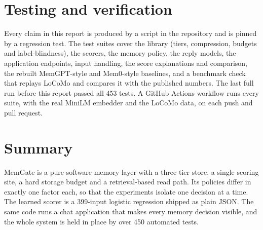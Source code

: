 \section{Testing and verification}
\label{sec:testing}
Every claim in this report is produced by a script in the repository and is
pinned by a regression test. The test suites cover the library (tiers,
compression, budgets and label-blindness), the scorers, the memory policy, the
reply models, the application endpoints, input handling, the score
explanations and comparison, the rebuilt MemGPT-style and Mem0-style
baselines, and a benchmark check that replays LoCoMo and compares it with the
published numbers. The last full run before this report passed all 453
tests. A GitHub Actions workflow runs every suite, with the real MiniLM
embedder and the LoCoMo data, on each push and pull request.

\section*{Summary}
MemGate is a pure-software memory layer with a three-tier store, a single
scoring site, a hard storage budget and a retrieval-based read path. Its
policies differ in exactly one factor each, so that the experiments isolate
one decision at a time. The learned scorer is a 399-input logistic regression
shipped as plain JSON. The same code runs a chat application that makes every
memory decision visible, and the whole system is held in place by over 450
automated tests.
